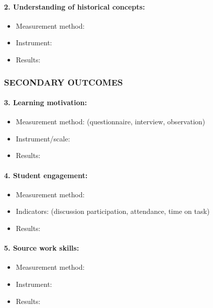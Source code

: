 \documentclass[
hf,
]{ceurart}
\begin{document}
\paragraph{2. Understanding of historical concepts:}
\begin{itemize}
    \item Measurement method: \underline{\hspace{4cm}}
    \item Instrument: \underline{\hspace{4cm}}
    \item Results: \underline{\hspace{6cm}}
\end{itemize}

\subsubsection*{SECONDARY OUTCOMES}

\paragraph{3. Learning motivation:}
\begin{itemize}
    \item Measurement method: \underline{\hspace{4cm}} (questionnaire, interview, observation)
    \item Instrument/scale: \underline{\hspace{4cm}}
    \item Results: \underline{\hspace{6cm}}
\end{itemize}

\paragraph{4. Student engagement:}
\begin{itemize}
    \item Measurement method: \underline{\hspace{4cm}}
    \item Indicators: \underline{\hspace{4cm}} (discussion participation, attendance, time on task)
    \item Results: \underline{\hspace{6cm}}
\end{itemize}

\paragraph{5. Source work skills:}
\begin{itemize}
    \item Measurement method: \underline{\hspace{4cm}}
    \item Instrument: \underline{\hspace{4cm}}
    \item Results: \underline{\hspace{6cm}}
\end{itemize}
\end{document}
